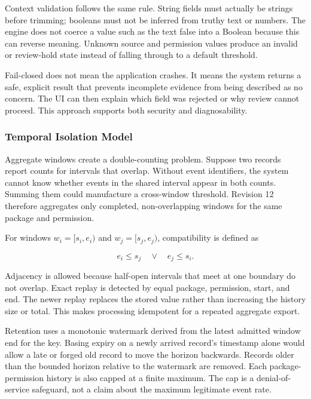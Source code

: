 Context validation follows the same rule. String fields must actually be strings before trimming; booleans must not be inferred from truthy text or numbers. The engine does not coerce a value such as the text false into a Boolean because this can reverse meaning. Unknown source and permission values produce an invalid or review-hold state instead of falling through to a default threshold.

Fail-closed does not mean the application crashes. It means the system returns a safe, explicit result that prevents incomplete evidence from being described as no concern. The UI can then explain which field was rejected or why review cannot proceed. This approach supports both security and diagnosability.

\subsubsection{Temporal Isolation Model}

Aggregate windows create a double-counting problem. Suppose two records report counts for intervals that overlap. Without event identifiers, the system cannot know whether events in the shared interval appear in both counts. Summing them could manufacture a cross-window threshold. Revision 12 therefore aggregates only completed, non-overlapping windows for the same package and permission.

For windows \(w_i=[s_i,e_i)\) and \(w_j=[s_j,e_j)\), compatibility is defined as

\begin{equation}
e_i \leq s_j \quad \lor \quad e_j \leq s_i.
\end{equation}

Adjacency is allowed because half-open intervals that meet at one boundary do not overlap. Exact replay is detected by equal package, permission, start, and end. The newer replay replaces the stored value rather than increasing the history size or total. This makes processing idempotent for a repeated aggregate export.

Retention uses a monotonic watermark derived from the latest admitted window end for the key. Basing expiry on a newly arrived record's timestamp alone would allow a late or forged old record to move the horizon backwards. Records older than the bounded horizon relative to the watermark are removed. Each package-permission history is also capped at a finite maximum. The cap is a denial-of-service safeguard, not a claim about the maximum legitimate event rate.

